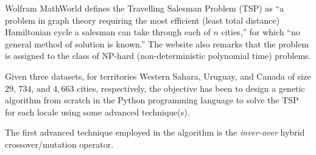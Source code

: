 Wolfram MathWorld defines the Travelling Salesman Problem (TSP) as ``a 
problem in graph theory requiring the most efficient (\ie least total distance) 
Hamiltonian cycle a salesman can take through each of $n$ cities,'' for which
``no general method of solution is known.'' \cite{tsp_wolfram_alpha} The 
website also remarks that the problem is assigned to the class of NP-hard 
(non-deterministic polynomial time) problems.

Given three datasets, for territories Western Sahara, Uruguay, and Canada of 
size $29$, $734$, and $4,663$ cities, respectively, the objective has been 
to design a genetic algorithm from scratch in the Python programming language
to solve the TSP for each locale using some advanced technique(s).

The first advanced technique employed in the algorithm is the {\em inver-over}
hybrid crossover/mutation operator. 



